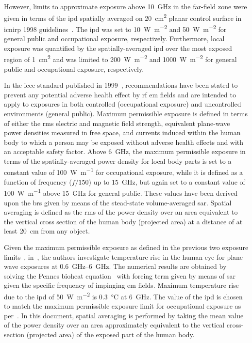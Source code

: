 However, limits to approximate exposure above \SI{10}{\GHz} in the far-field zone were given in terms of the \gls{ipd} spatially averaged on \SI{20}{\cm\squared} planar control surface in \gls{icnirp} 1998 guidelines~\cite{ICNIRP1998Guidlines}.
The \gls{ipd} was set to \SI{10}{\watt\per\meter\squared} and \SI{50}{\watt\per\meter\squared} for general public and occupational exposure, respectively.
Furthermore, local exposure was quantified by the spatially-averaged \gls{ipd} over the most exposed region of \SI{1}{\cm\squared} and was limited to \SI{200}{\watt\per\meter\squared} and \SI{1000}{\watt\per\meter\squared} for general public and occupational exposure, respectively.

In the \gls{ieee} standard published in 1999~\cite{IEEE1999Standard}, recommendations have been stated to prevent any potential adverse health effect by \gls{rf} \gls{em} fields and are intended to apply to exposures in both controlled (occupational exposure) and uncontrolled environments (general public).
Maximum permissible exposure is defined in terms of either the \gls{rms} electric and magnetic field strength, equivalent plane-wave power densities measured in free space, and currents induced within the human body to which a person may be exposed without adverse health effects and with an acceptable safety factor.
Above \SI{6}{\GHz}, the maximum permissible exposure in terms of the spatially-averaged power density for local body parts is set to a constant value of \SI{100}{\watt\per\meter} for occupational exposure, while it is defined as a function of frequency ($f / 150$) up to \SI{15}{\GHz}, but again set to a constant value of \SI{100}{\watt\per\meter} above \SI{15}{\GHz} for general public.
These values have been derived upon the \gls{br}s given by means of the stead-state volume-averaged \gls{sar}.
Spatial averaging is defined as the \gls{rms} of the power density over an area equivalent to the vertical cross section of the human body (projected area) at a distance of at least \SI{20}{\cm} from any object.

Given the maximum permissible exposure as defined in the previous two exposure limits~\cite{IEEE1999Standard,ICNIRP1998Guidlines}, in~\cite{Hirata2000Temperature}, the authors investigate temperature rise in the human eye for plane wave exposures at \SIrange[range-units=single,range-phrase=--]{0.6}{6}{\GHz}.
The numerical results are obtained by solving the Pennes bioheat equation~\cite{Pennes1948Analysis} with forcing term given by means of \gls{sar} given the specific frequency of impinging \gls{em} fields.
Maximum temperature rise due to the \gls{ipd} of \SI{50}{\watt\per\meter\squared} is \SI{0.3}{\celsius} at \SI{6}{\GHz}.
The value of the \gls{ipd} is chosen to match the maximum permissible exposure limit for occupational exposure as per~\cite{Ulcek1997Evaluating}.
In this document, spatial averaging is performed by taking the mean value of the power density over an area approximately equivalent to the vertical cross-section (projected area) of the exposed part of the human body.

